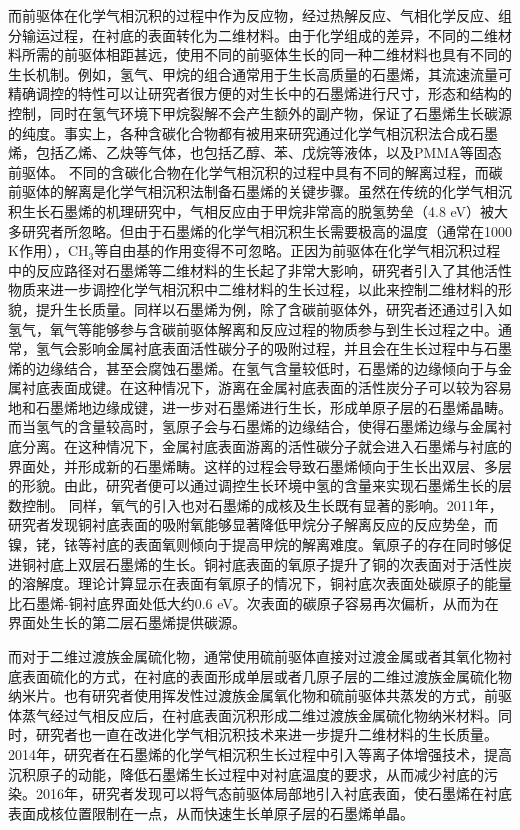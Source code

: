     而前驱体在化学气相沉积的过程中作为反应物，经过热解反应、气相化学反应、组分输运过程，在衬底的表面转化为二维材料。由于化学组成的差异，不同的二维材料所需的前驱体相距甚远，使用不同的前驱体生长的同一种二维材料也具有不同的生长机制。例如，氢气、甲烷的组合通常用于生长高质量的石墨烯，其流速流量可精确调控的特性可以让研究者很方便的对生长中的石墨烯进行尺寸，形态和结构的控制，同时在氢气环境下甲烷裂解不会产生额外的副产物，保证了石墨烯生长碳源的纯度。事实上，各种含碳化合物都有被用来研究通过化学气相沉积法合成石墨烯，包括乙烯、乙炔等气体，也包括乙醇、苯、戊烷等液体，以及PMMA等固态前驱体。%
    不同的含碳化合物在化学气相沉积的过程中具有不同的解离过程，而碳前驱体的解离是化学气相沉积法制备石墨烯的关键步骤。虽然在传统的化学气相沉积生长石墨烯的机理研究中，气相反应由于甲烷非常高的脱氢势垒（4.8 eV）被大多研究者所忽略。但由于石墨烯的化学气相沉积生长需要极高的温度（通常在1000 K作用），CH$_3$等自由基的作用变得不可忽略。正因为前驱体在化学气相沉积过程中的反应路径对石墨烯等二维材料的生长起了非常大影响，研究者引入了其他活性物质来进一步调控化学气相沉积中二维材料的生长过程，以此来控制二维材料的形貌，提升生长质量。同样以石墨烯为例，除了含碳前驱体外，研究者还通过引入如氢气，氧气等能够参与含碳前驱体解离和反应过程的物质参与到生长过程之中。通常，氢气会影响金属衬底表面活性碳分子的吸附过程，并且会在生长过程中与石墨烯的边缘结合，甚至会腐蚀石墨烯。在氢气含量较低时，石墨烯的边缘倾向于与金属衬底表面成键。在这种情况下，游离在金属衬底表面的活性炭分子可以较为容易地和石墨烯地边缘成键，进一步对石墨烯进行生长，形成单原子层的石墨烯晶畴。而当氢气的含量较高时，氢原子会与石墨烯的边缘结合，使得石墨烯边缘与金属衬底分离。在这种情况下，金属衬底表面游离的活性碳分子就会进入石墨烯与衬底的界面处，并形成新的石墨烯畴。这样的过程会导致石墨烯倾向于生长出双层、多层的形貌。由此，研究者便可以通过调控生长环境中氢的含量来实现石墨烯生长的层数控制。%
    同样，氧气的引入也对石墨烯的成核及生长既有显著的影响。2011年，研究者发现铜衬底表面的吸附氧能够显著降低甲烷分子解离反应的反应势垒，而镍，铑，铱等衬底的表面氧则倾向于提高甲烷的解离难度。氧原子的存在同时够促进铜衬底上双层石墨烯的生长。铜衬底表面的氧原子提升了铜的次表面对于活性炭的溶解度。理论计算显示在表面有氧原子的情况下，铜衬底次表面处碳原子的能量比石墨烯-铜衬底界面处低大约0.6 eV。次表面的碳原子容易再次偏析，从而为在界面处生长的第二层石墨烯提供碳源。

    而对于二维过渡族金属硫化物，通常使用硫前驱体直接对过渡金属或者其氧化物衬底表面硫化的方式，在衬底的表面形成单层或者几原子层的二维过渡族金属硫化物纳米片。也有研究者使用挥发性过渡族金属氧化物和硫前驱体共蒸发的方式，前驱体蒸气经过气相反应后，在衬底表面沉积形成二维过渡族金属硫化物纳米材料。同时，研究者也一直在改进化学气相沉积技术来进一步提升二维材料的生长质量。2014年，研究者在石墨烯的化学气相沉积生长过程中引入等离子体增强技术，提高沉积原子的动能，降低石墨烯生长过程中对衬底温度的要求，从而减少衬底的污染。2016年，研究者发现可以将气态前驱体局部地引入衬底表面，使石墨烯在衬底表面成核位置限制在一点，从而快速生长单原子层的石墨烯单晶。

